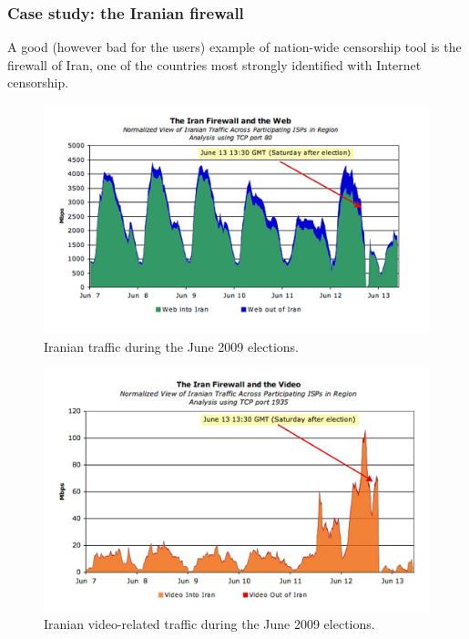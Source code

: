 \subsubsection*{Case study: the Iranian firewall}
A good (however bad for the users) example of nation-wide censorship tool is the firewall of Iran, one of the countries most strongly identified with Internet censorship.

\begin{figure}[H]
    \centering
    \includegraphics[scale=1]{img/l7_filtering_iran.png}
    \decoRule
    \caption{Iranian traffic during the June 2009 elections.}
    \label{fig:l7_filtering_iran}
\end{figure}

\begin{figure}[H]
    \centering
    \includegraphics[scale=1]{img/l7_filtering_iran_2.png}
    \decoRule
    \caption{Iranian video-related traffic during the June 2009 elections.}
    \label{fig:l7_filtering_iran_2}
\end{figure}

